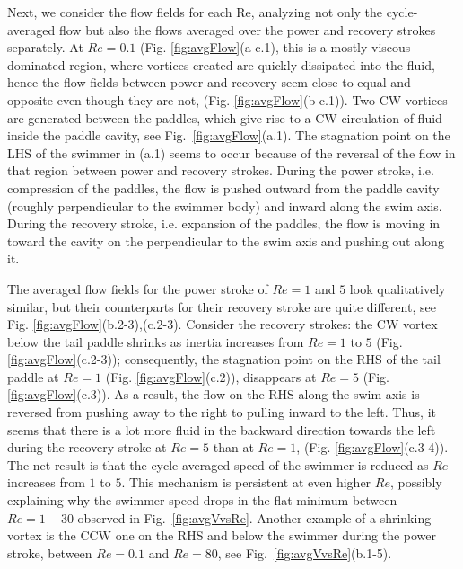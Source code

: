 \documentclass[%
 onecolumn,
superscriptaddress,
 amsmath,amssymb,
 aps,
longbibliography
]{revtex4-2}
\begin{document}
Next, we consider the flow fields for each Re, analyzing not only the cycle-averaged flow but also the flows averaged over the power and recovery strokes separately. 
At $Re = 0.1$ (Fig. \ref{fig:avgFlow}(a-c.1), this is a mostly viscous-dominated region, where vortices created are quickly dissipated into the fluid, hence the flow fields between power and recovery seem close to equal and opposite even though they are not, (Fig. \ref{fig:avgFlow}(b-c.1)). Two CW vortices are generated between the paddles, which give rise to a CW circulation of fluid inside the paddle cavity, see Fig.~\ref{fig:avgFlow}(a.1). The stagnation point on the LHS of the swimmer in (a.1) seems to occur because of the reversal of the flow in that region between power and recovery strokes. During the power stroke, i.e. compression of the paddles, the flow is pushed outward from the paddle cavity (roughly perpendicular to the swimmer body) and inward along the swim axis. During the recovery stroke, i.e. expansion of the paddles, the flow is moving in toward the cavity on the perpendicular to the swim axis and pushing out along it.    

The averaged flow fields for the power stroke of $Re = 1$ and $5$ look qualitatively similar, but their counterparts for their recovery stroke are quite different, see Fig. \ref{fig:avgFlow}(b.2-3),(c.2-3). Consider the recovery strokes: the CW vortex below the tail paddle shrinks as inertia increases from $Re = 1$ to $5$ (Fig. \ref{fig:avgFlow}(c.2-3)); consequently, the stagnation point on the RHS of the tail paddle at $Re = 1$ (Fig. \ref{fig:avgFlow}(c.2)), disappears at $Re = 5$ (Fig. \ref{fig:avgFlow}(c.3)). As a result, the flow on the RHS along the swim axis is reversed from pushing away to the right to pulling inward to the left. Thus, it seems that there is a lot more fluid in the backward direction towards the left during the recovery stroke at $Re=5$ than at $Re=1$, (Fig. \ref{fig:avgFlow}(c.3-4)). The net result is that the cycle-averaged speed of the swimmer is reduced as $Re$ increases from $1$ to $5$. This mechanism is persistent at even higher $Re$, possibly explaining why the swimmer speed drops in the flat minimum between $Re = 1 - 30$ observed in Fig.~\ref{fig:avgVvsRe}. 
Another example of a shrinking vortex is the CCW one on the RHS and below the swimmer during the power stroke, between $Re=0.1$ and $Re=80$, see Fig.~\ref{fig:avgVvsRe}(b.1-5). 
\end{document}
